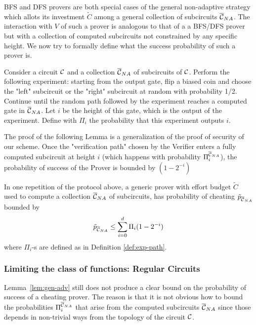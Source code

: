 BFS and DFS provers are both special cases of the general non-adaptive strategy which allots its investment $\tilde{C}$ among a general collection of subcircuits $\overline{\cal{C}}_{NA}$.
The interaction with $V$ of such a prover is analogous to that of a a BFS/DFS prover but with a collection of computed subcircuits not constrained by any specific height. We now try to formally define what the success probability of such a prover is. 

\begin{mydef}
	\label{def:exp-path}
	Consider a circuit $\cal C$ and a collection $\overline{\cal{C}}_{NA}$ of subcircuits of $\cal C$. Perform the following experiment: starting from the output gate, flip a biased coin and choose the "left" subcircuit or the "right" subcircuit at random with probability 1/2. Continue until the random path followed by the experiment reaches a computed gate in $\overline{\cal{C}}_{NA}$. Let $i$ be the height of this gate, which is the output of the experiment. Define with $\Pi_i$ the probability that this experiment outputs $i$.
\end{mydef}

The proof of the following Lemma is a generalization of the proof of security of our scheme. Once the "verification path" chosen by the Verifier enters a fully computed subcircuit at height $i$ (which happens with probability $\Pi_i^{\overline{\cal{C}}_{NA}}$), the probability of success of the Prover is bounded by $(1 - 2^{-i})$

\begin{mylemma}
\label{lem:gen-adv}
	In one repetition of the protocol above, a generic prover with effort budget $\tilde{C}$ used to compute a collection $\overline{\cal{C}}_{NA}$ of subcircuits, has probability of cheating $\tilde{p}_{\overline{\cal{C}}_{NA}}$ bounded by
	$$ \tilde{p}_{\overline{\cal{C}}_{NA}} \leq \sum_{i=0}^{d} \Pi_i (1 - 2^{-i})$$
	where $\Pi_i$-s are defined as in Definition \ref{def:exp-path}.
\end{mylemma}

\subsubsection{Limiting the class of functions: Regular Circuits}


\smallskip
\noindent
Lemma~\ref{lem:gen-adv} still does not produce a clear bound on the probability of success of a cheating prover. The reason is that it is not obvious
how to bound the probabilities $\Pi_i^{\overline{\cal{C}}_{NA}}$ that arise from the computed subcircuits $\overline{\cal{C}}_{NA}$ since those depends in non-trivial ways from the 
topology of the circuit $\cal C$. 

